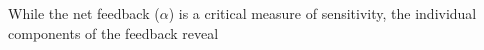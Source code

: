 \documentclass[draft]{agujournal2019}
\begin{document}
%
While the net feedback ($\alpha$) is a critical measure of sensitivity, the individual components of the feedback reveal 
\end{document}
